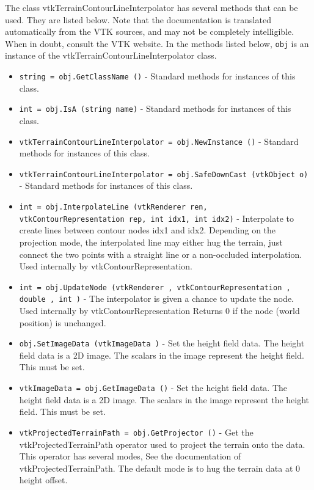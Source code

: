 The class vtkTerrainContourLineInterpolator has several methods that can be used.
  They are listed below.
Note that the documentation is translated automatically from the VTK sources,
and may not be completely intelligible.  When in doubt, consult the VTK website.
In the methods listed below, \verb|obj| is an instance of the vtkTerrainContourLineInterpolator class.
\begin{itemize}
\item  \verb|string = obj.GetClassName ()| -  Standard methods for instances of this class.

\item  \verb|int = obj.IsA (string name)| -  Standard methods for instances of this class.

\item  \verb|vtkTerrainContourLineInterpolator = obj.NewInstance ()| -  Standard methods for instances of this class.

\item  \verb|vtkTerrainContourLineInterpolator = obj.SafeDownCast (vtkObject o)| -  Standard methods for instances of this class.

\item  \verb|int = obj.InterpolateLine (vtkRenderer ren, vtkContourRepresentation rep, int idx1, int idx2)| -  Interpolate to create lines between contour nodes idx1 and idx2.
 Depending on the projection mode, the interpolated line may either 
 hug the terrain, just connect the two points with a straight line or 
 a non-occluded interpolation. 
 Used internally by vtkContourRepresentation.

\item  \verb|int = obj.UpdateNode (vtkRenderer , vtkContourRepresentation , double , int )| -  The interpolator is given a chance to update the node.
 Used internally by vtkContourRepresentation
 Returns 0 if the node (world position) is unchanged.

\item  \verb|obj.SetImageData (vtkImageData )| -  Set the height field data. The height field data is a 2D image. The
 scalars in the image represent the height field. This must be set.

\item  \verb|vtkImageData = obj.GetImageData ()| -  Set the height field data. The height field data is a 2D image. The
 scalars in the image represent the height field. This must be set.

\item  \verb|vtkProjectedTerrainPath = obj.GetProjector ()| -  Get the vtkProjectedTerrainPath operator used to project the terrain
 onto the data. This operator has several modes, See the documentation
 of vtkProjectedTerrainPath. The default mode is to hug the terrain
 data at 0 height offset.

\end{itemize}
